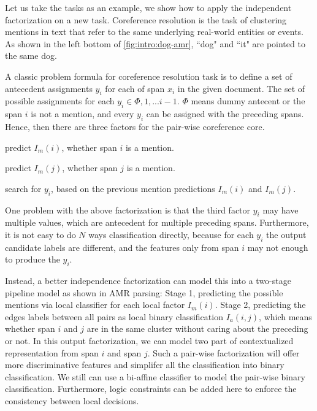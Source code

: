 Let us take the  tasks as an example, we
show how to apply the independent factorization on a new
task. Coreference resolution is the task of clustering mentions in
text that refer to the same underlying real-world entities or
events. As shown in the left bottom of \autoref{fig:intro:dog-amr},
``dog" and ``it" are pointed to the same dog.

A classic problem formula for coreference resolution task is to define
a set of antecedent assignments $y_{i}$ for each of span $x_{i}$ in
the given document. The set of possible assignments for each
$y_{i} \in {\Phi, 1,...i-1}$. $\Phi$ means dummy antecent or the span
$i$ is not a mention, and every $y_{i}$ can be assigned with the
preceding spans.  Hence, then there are three factors for the
pair-wise coreference core.
\begin{inparaenum}[(1)]
\item predict $I_{m}(i)$, whether span $i$ is a mention.
\item predict $I_{m}(j)$, whether span $j$ is a mention.
\item search for $y_{i}$, based on the previous mention predictions
  $I_{m}(i)$ and $I_{m}(j)$.
\end{inparaenum}

One problem with the above factorization is that the third factor
$y_{i}$ may have multiple values, which are antecedent for multiple
preceding spans. Furthermore, it is not easy to do $N$ ways
classification directly, because for each $y_{i}$ the output candidate
labels are different, and the features only from span $i$ may not
enough to produce the $y_{i}$.

Instead, a better independence factorization can model this into
a two-stage pipeline model as shown in AMR parsing: Stage 1, predicting
the possible mentions via local classifier for each local factor
$I_{m}(i)$. Stage 2, predicting the edges labels between all pairs as
local binary classification $I_{a}(i,j)$, which means whether span $i$
and $j$ are in the same cluster without caring about the preceding or
not. In this output factorization, we can model two part of
contextualized representation from span $i$ and span $j$. Such a
pair-wise factorization will offer more discriminative features and
simplifer all the classification into binary classification.  We still
can use a bi-affine classifier to model the pair-wise binary
classification. Furthermore, logic constraints can be added here to
enforce the consistency between local decisions.

